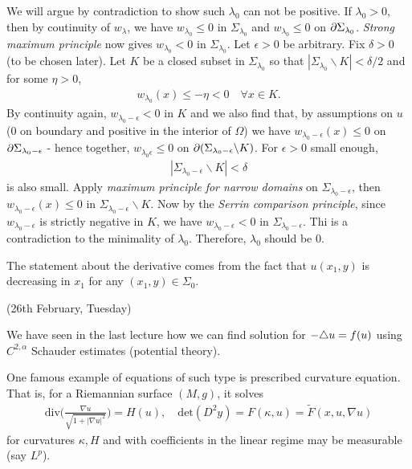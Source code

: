 \documentclass[12pt,a4paper]{article}
\newenvironment{proof}
{\begin{changemargin}{0.5cm}{0.5cm} 
	}%
	{\end{changemargin}
}
\newenvironment{p}
{\begin{proof} 
	}%
	{\end{proof}
}
\begin{document}
\begin{p}
\quad We will argue by contradiction to show such $\lambda_0$ can not be positive. If $\lambda_0 >0$, then by coutinuity of $w_{\lambda}$, we have $w_{\lambda_0} \leq 0$ in $\Sigma_{\lambda_0}$ and $w_{\lambda_0} \leq 0$ on $\partial \Sigma_{\lambda_0}$. \emph{Strong maximum principle} now gives $w_{\lambda_0} < 0$ in $\Sigma_{\lambda_0}$.  Let $\epsilon >0$ be arbitrary. Fix $\delta >0$ (to be chosen later). Let $K$ be a closed subset in $\Sigma_{\lambda_0}$ so that $|\Sigma_{\lambda_0} \backslash K| < \delta/2$ and for some $\eta >0$,
\begin{align*}
w_{\lambda_0}(x) \leq -\eta <0 \quad \forall x\in K.
\end{align*}
By continuity again, $w_{\lambda_0 - \epsilon} < 0$ in $K$ and we also find that, by assumptions on $u$ (0 on boundary and positive in the interior of $\Omega$) we have $w_{\lambda_0 - \epsilon}(x) \leq 0$ on $\partial \Sigma_{\lambda_0 - \epsilon}$ - hence together, $w_{\lambda_0 \epsilon} \leq 0$ on $\partial (\Sigma_{\lambda_0 -\epsilon} \backslash K)$. For $\epsilon >0$ small enough,
\begin{align*}
|\Sigma_{\lambda_0 -\epsilon} \backslash K| < \delta
\end{align*}
is also small. Apply \emph{maximum principle for narrow domains} on $\Sigma_{\lambda_0 - \epsilon}$, then $w_{\lambda_0 - \epsilon}(x) \leq 0$ in $\Sigma_{\lambda_0 - \epsilon} \backslash K$. Now by the \emph{Serrin comparison principle}, since $w_{\lambda_0 -\epsilon}$ is strictly negative in $K$, we have $w_{\lambda_0 - \epsilon} < 0$ in $\Sigma_{\lambda_0 -\epsilon}$. Thi is a contradiction to the minimality of $\lambda_0$. Therefore, $\lambda_0$ should be 0.
\s

The statement about the derivative comes from the fact that $u(x_1, y)$ is decreasing in $x_1$ for any $(x_1, y) \in \Sigma_0$.

\eop
\end{p}
\s

\newday

(26th February, Tuesday)
\s

We have seen in the last lecture how we can find solution for $-\triangle u = f(u)$ using $C^{2, \alpha}$ Schauder estimates (potential theory).

\quad One famous example of equations of such type is prescribed curvature equation. That is, for a Riemannian surface $(M,g)$, it solves
\begin{align*}
\text{div}\big( \frac{\nabla u}{\sqrt{1 + |\nabla u|^2}} \big) = H(u), \quad \text{det}(D^2 y) = F(\kappa, u) = \tilde{F}(x, u, \nabla u)
\end{align*}
for curvatures $\kappa, H$ and with coefficients in the linear regime may be measurable (say $L^p$).
\s
\end{document}
